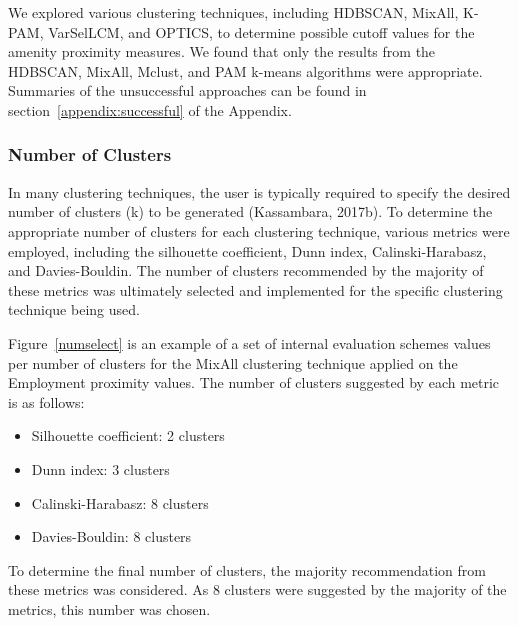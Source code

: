 \documentclass[11pt, a4paper]{article}
\begin{document}
We explored various clustering techniques, including HDBSCAN, MixAll, K-PAM, VarSelLCM, and OPTICS, to determine possible cutoff values for the amenity proximity measures. We found that only the results from the HDBSCAN, MixAll, Mclust, and PAM k-means algorithms were appropriate. Summaries of the unsuccessful approaches can be found in section~\ref{appendix:successful} of the Appendix.





\subsubsection{Number of Clusters}

In many clustering techniques, the user is typically required to specify the desired number of clusters (k) to be generated (Kassambara, 2017b). To determine the appropriate number of clusters for each clustering technique, various metrics were employed, including the silhouette coefficient, Dunn index, Calinski-Harabasz, and Davies-Bouldin. The number of clusters recommended by the majority of these metrics was ultimately selected and implemented for the specific clustering technique being used.
\par
Figure~\ref{numselect} is an example of a set of internal evaluation schemes values per number of clusters for the MixAll clustering technique applied on the Employment proximity values. The number of clusters suggested by each metric is as follows:
\begin{itemize}
\item Silhouette coefficient: 2 clusters
\item Dunn index: 3 clusters
\item Calinski-Harabasz: 8 clusters
\item Davies-Bouldin: 8 clusters
\end{itemize}
To determine the final number of clusters, the majority recommendation from these metrics was considered. As 8 clusters were suggested by the majority of the metrics, this number was chosen.
\end{document}
